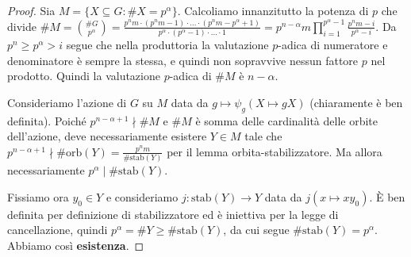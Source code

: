 \begin{proof}
    Sia $M = \{ X \subseteq G : \#X = p^{\alpha}\}$.  Calcoliamo innanzitutto la potenza di $p$ che divide $\#M = \binom{\#G}{p^{\alpha}} = \frac{p^nm \cdot (p^nm-1) \cdot \dots \cdot (p^nm - p^{\alpha} +1)}{p^{\alpha}\cdot(p^{\alpha}-1)\cdot \dots \cdot 1} = p^{n-\alpha}m \prod_{i=1}^{p^{\alpha}-1} \frac{p^nm-i}{p^{\alpha}-i}$. Da $p^n \geq p^{\alpha} > i$ segue che nella produttoria la valutazione $p$-adica di numeratore e denominatore è sempre la stessa, e quindi non sopravvive nessun fattore $p$ nel prodotto. Quindi la valutazione $p$-adica di $\#M$ è $n-\alpha$.
    
    Consideriamo l'azione di $G$ su $M$ data da $g\mapsto \psi_g(X \mapsto gX)$ (chiaramente è ben definita). Poiché $p^{n-\alpha +1} \nmid \#M$ e $\#M$ è somma delle cardinalità delle orbite dell'azione, deve necessariamente esistere $Y \in M$ tale che $p^{n-\alpha +1} \nmid \#\text{orb}(Y) = \frac{p^nm}{\#\text{stab}(Y)}$ per il lemma orbita-stabilizzatore. Ma allora necessariamente $p^{\alpha} \mid \#\text{stab}(Y)$.
    
    Fissiamo ora $y_0 \in Y$ e consideriamo $j: \text{stab}(Y) \rightarrow Y$ data da $j(x \mapsto xy_0)$. È ben definita per definizione di stabilizzatore ed è iniettiva per la legge di cancellazione, quindi $p^{\alpha} = \#Y \geq \#\text{stab}(Y)$, da cui segue $\#\text{stab}(Y) = p^{\alpha}$. Abbiamo così \textbf{esistenza}.
    

\end{proof}
